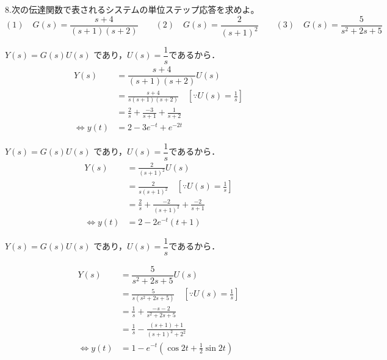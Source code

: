\documentclass[a4paper,12pt]{article}
\begin{document}
\vspace{2mm}

8.次の伝達関数で表されるシステムの単位ステップ応答を求めよ。\\
\[
(1) \quad G(s) = \frac{s+4}{(s+1)(s+2)} \qquad
(2) \quad G(s) = \frac{2}{(s+1)^2} \qquad
(3) \quad G(s) = \frac{5}{s^2+2s+5}
\]

\begin{tcolorbox}[title={8.(1) \(G(s) = \dfrac{s+4}{(s+1)(s+2)}\) }]

    \qquad \(Y(s) =G(s)U(s)\) であり，\(U(s)=\dfrac{1}{s}\)であるから． 
    \begin{align*}
        Y(s)
        &= \dfrac{s+4}{(s+1)(s+2)}U(s) \\
        &= \frac{s+4}{s(s+1)(s+2)} \quad [\because U(s)=\frac{1}{s}]\\
        &= \frac{2}{s} + \frac{-3}{s+1} + \frac{1}{s+2}\\
        \Leftrightarrow y(t) &=2 - 3e^{-t} + e^{-2t}
    \end{align*}

\end{tcolorbox}

\begin{tcolorbox}[title={8.(2) \(G(s) = \dfrac{2}{(s+1)^2}\) }]

    \qquad \(Y(s) =G(s)U(s)\) であり，\(U(s)=\dfrac{1}{s}\)であるから． 
    \begin{align*}
        Y(s)
        &= \frac{2}{(s+1)^2}U(s) \\
        &= \frac{2}{s(s+1)^2} \quad [\because U(s)=\frac{1}{s}]\\
        &= \frac{2}{s} + \frac{-2}{(s+1)^2} + \frac{-2}{s+1}\\
        \Leftrightarrow y(t) &=2 - 2e^{-t}(t+1) 
    \end{align*}

\end{tcolorbox}

\begin{tcolorbox}[title={8.(3) \(G(s) = \dfrac{5}{s^2+2s+5}\) }]

    \qquad \(Y(s) =G(s)U(s)\) であり，\(U(s)=\dfrac{1}{s}\)であるから． 

    \begin{align*}
        Y(s)
        &= \dfrac{5}{s^2+2s+5}U(s) \\
        &= \frac{5}{s(s^2+2s+5)} \quad [\because U(s)=\frac{1}{s}]\\
        &= \frac{1}{s} + \frac{-s-2}{s^2+2s+5}\\
        &= \frac{1}{s} - \frac{(s+1)+1}{(s+1)^2+2^2}\\
        \Leftrightarrow y(t) &=1-e^{-t}(\cos 2t + \frac{1}{2} \sin 2t)
    \end{align*}

\end{tcolorbox}
\end{document}
